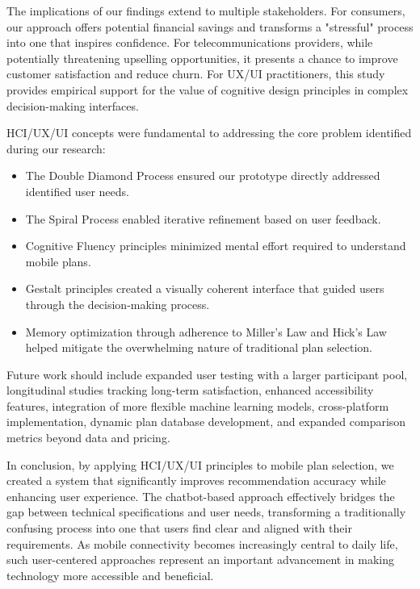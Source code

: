 \documentclass[conference]{IEEEtran}
\begin{document}
The implications of our findings extend to multiple stakeholders. For consumers, our approach offers potential financial savings and transforms a "stressful" process into one that inspires confidence. For telecommunications providers, while potentially threatening upselling opportunities, it presents a chance to improve customer satisfaction and reduce churn. For UX/UI practitioners, this study provides empirical support for the value of cognitive design principles in complex decision-making interfaces.

HCI/UX/UI concepts were fundamental to addressing the core problem identified during our research:

\begin{itemize}
    \item The Double Diamond Process ensured our prototype directly addressed identified user needs.
    \item The Spiral Process enabled iterative refinement based on user feedback.
    \item Cognitive Fluency principles minimized mental effort required to understand mobile plans.
    \item Gestalt principles created a visually coherent interface that guided users through the decision-making process.
    \item Memory optimization through adherence to Miller's Law and Hick's Law helped mitigate the overwhelming nature of traditional plan selection.
\end{itemize}

Future work should include expanded user testing with a larger participant pool, longitudinal studies tracking long-term satisfaction, enhanced accessibility features, integration of more flexible machine learning models, cross-platform implementation, dynamic plan database development, and expanded comparison metrics beyond data and pricing.

In conclusion, by applying HCI/UX/UI principles to mobile plan selection, we created a system that significantly improves recommendation accuracy while enhancing user experience. The chatbot-based approach effectively bridges the gap between technical specifications and user needs, transforming a traditionally confusing process into one that users find clear and aligned with their requirements. As mobile connectivity becomes increasingly central to daily life, such user-centered approaches represent an important advancement in making technology more accessible and beneficial.
\end{document}
